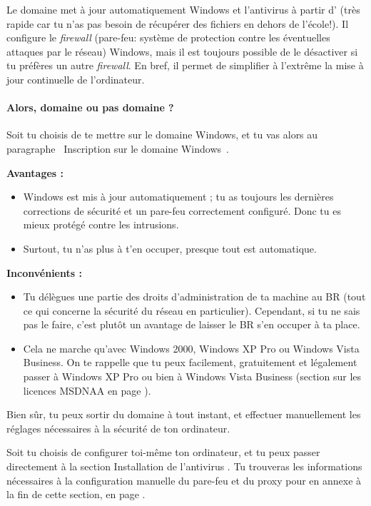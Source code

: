 Le domaine met à jour automatiquement Windows et l'antivirus à partir d' (très rapide car tu n'as pas besoin de récupérer des fichiers
en dehors de l'école!). Il configure le \emph{firewall} (pare-feu: système de protection contre les éventuelles attaques par le réseau) Windows, mais
il est toujours possible de le désactiver si tu préfères un autre \emph{firewall}. En bref, il permet de simplifier à l'extrême la mise à jour
continuelle de l'ordinateur.


\paragraph{Alors, domaine ou pas domaine ?} Soit tu choisis de te
mettre sur le domaine Windows, et tu vas alors au paragraphe
\guillemotleft~Inscription sur le domaine Windows~\guillemotright.

\textbf{Avantages :}
\begin{itemize}
\item Windows est mis à jour automatiquement ; tu as toujours les
dernières corrections de sécurité et un pare-feu correctement
configuré. Donc tu es mieux protégé contre les intrusions.
\item Surtout, tu n'as plus à t'en occuper, presque tout est automatique.
\end{itemize}

\textbf{Inconvénients :}
\begin{itemize}
  \item Tu délègues une partie des droits d'administration de ta machine au BR
        (tout ce qui concerne la sécurité du réseau en particulier).
        Cependant, si tu ne sais pas le faire, c'est plut\^ot un avantage
        de laisser le BR s'en occuper à ta place.
  \item Cela ne marche qu'avec Windows 2000, Windows XP Pro ou Windows Vista Business.
        On te rappelle que tu peux facilement, gratuitement et légalement passer à
        Windows XP Pro ou bien à Windows Vista Business (section sur les licences
        MSDNAA en page \pageref{msdnaa}).
\end{itemize}

Bien s\^{u}r, tu peux sortir du domaine à tout instant, et effectuer manuellement les réglages nécessaires à la sécurité de ton ordinateur.

Soit tu choisis de configurer toi-même ton ordinateur, et tu peux passer
directement à la section \guillemotleft Installation de l'antivirus
\guillemotright. Tu trouveras les informations nécessaires à la configuration
manuelle du pare-feu et du proxy pour  en annexe à la
fin de cette section, en page \pageref{horsdomaine}.

